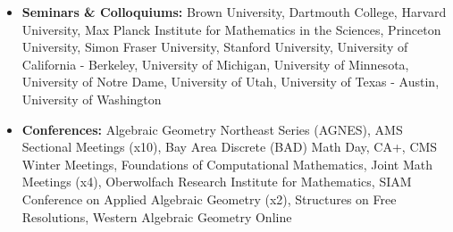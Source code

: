 \documentclass[letterpaper,11pt]{article}
\begin{document}
\begin{itemize} 
\item \textbf{Seminars \& Colloquiums:} Brown University, Dartmouth College, Harvard University, Max Planck Institute for Mathematics in the Sciences, Princeton University, Simon Fraser University, Stanford University, University of California - Berkeley, University of Michigan, University of Minnesota, University of Notre Dame, University of Utah, University of Texas - Austin, University of Washington
 \item \textbf{Conferences:} Algebraic Geometry Northeast Series (AGNES), AMS Sectional Meetings (x10), Bay Area Discrete (BAD) Math Day, CA+, CMS Winter Meetings, Foundations of Computational Mathematics, Joint Math Meetings (x4), Oberwolfach Research Institute for Mathematics, SIAM Conference on Applied Algebraic Geometry (x2), Structures on Free Resolutions, Western Algebraic Geometry Online
\end{itemize}
\end{document}
